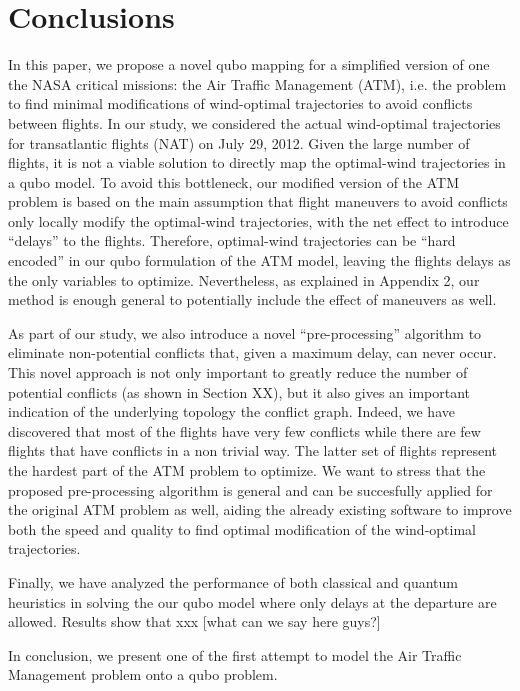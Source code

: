 \section{Conclusions}
In this paper, we propose a novel qubo mapping for a simplified version of one
the NASA critical missions: the Air Traffic Management (ATM), i.e. the problem
to find minimal modifications of wind-optimal trajectories to avoid conflicts
between flights. In our study, we considered the actual wind-optimal
trajectories for transatlantic flights (NAT) on July 29, 2012. Given the large
number of flights, it is not a viable solution to directly map the optimal-wind
trajectories in a qubo model. To avoid this bottleneck, our modified version of
the ATM problem is based on the main assumption that flight maneuvers to avoid
conflicts only locally modify the optimal-wind trajectories, with the net effect
to introduce ``delays'' to the flights. Therefore, optimal-wind trajectories can
be ``hard encoded'' in our qubo formulation of the ATM model, leaving the
flights delays as the only variables to optimize. Nevertheless, as explained in
Appendix 2, our method is enough general to potentially include the effect of
maneuvers as well. 

As part of our study, we also introduce a novel ``pre-processing'' algorithm to
eliminate non-potential conflicts that, given a maximum delay, can never occur.
This novel approach is not only important to greatly reduce the number of
potential conflicts (as shown in Section XX), but it also gives an important
indication of the underlying topology the conflict graph. Indeed, we have
discovered that most of the flights have very few conflicts while there are
few flights that have conflicts in a non trivial way. The latter set of flights
represent the hardest part of the ATM problem to optimize. We want to stress
that the proposed pre-processing algorithm is general and can be succesfully
applied for the original ATM problem as well, aiding the already existing
software to improve both the speed and quality to find optimal modification of
the wind-optimal trajectories. 

Finally, we have analyzed the performance of both classical and quantum
heuristics in solving the our qubo model where only delays at the departure are
allowed. Results show that xxx [what can we say here guys?]

In conclusion, we present one of the first attempt to model the Air Traffic
Management problem onto a qubo problem. 
